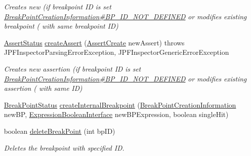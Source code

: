 \begin{DoxyCompactItemize}
\begin{DoxyCompactList}\small\item\em Creates new (if breakpoint ID is set \hyperlink{interfacegov_1_1nasa_1_1jpf_1_1inspector_1_1interfaces_1_1_break_point_creation_information_a24626231e3744e59f505d0731d4ca9e1}{Break\+Point\+Creation\+Information\#\+B\+P\+\_\+\+I\+D\+\_\+\+N\+O\+T\+\_\+\+D\+E\+F\+I\+N\+ED} or modifies existing breakpoint ( with same breakpoint ID) \end{DoxyCompactList}\item 
\hyperlink{interfacegov_1_1nasa_1_1jpf_1_1inspector_1_1interfaces_1_1_assert_status}{Assert\+Status} \hyperlink{classgov_1_1nasa_1_1jpf_1_1inspector_1_1server_1_1breakpoints_1_1_break_point_handler_a770f440dad54f670230ad73196da657d}{create\+Assert} (\hyperlink{interfacegov_1_1nasa_1_1jpf_1_1inspector_1_1interfaces_1_1_assert_create}{Assert\+Create} new\+Assert)  throws J\+P\+F\+Inspector\+Parsing\+Error\+Exception, J\+P\+F\+Inspector\+Generic\+Error\+Exception 
\begin{DoxyCompactList}\small\item\em Creates new assertion (if breakpoint ID is set \hyperlink{interfacegov_1_1nasa_1_1jpf_1_1inspector_1_1interfaces_1_1_break_point_creation_information_a24626231e3744e59f505d0731d4ca9e1}{Break\+Point\+Creation\+Information\#\+B\+P\+\_\+\+I\+D\+\_\+\+N\+O\+T\+\_\+\+D\+E\+F\+I\+N\+ED} or modifies existing assertion ( with same ID) \end{DoxyCompactList}\item 
\hyperlink{interfacegov_1_1nasa_1_1jpf_1_1inspector_1_1interfaces_1_1_break_point_status}{Break\+Point\+Status} \hyperlink{classgov_1_1nasa_1_1jpf_1_1inspector_1_1server_1_1breakpoints_1_1_break_point_handler_ac60a6198df25bc3076016a711f5f7346}{create\+Internal\+Breakpoint} (\hyperlink{interfacegov_1_1nasa_1_1jpf_1_1inspector_1_1interfaces_1_1_break_point_creation_information}{Break\+Point\+Creation\+Information} new\+BP, \hyperlink{interfacegov_1_1nasa_1_1jpf_1_1inspector_1_1server_1_1expression_1_1_expression_boolean_interface}{Expression\+Boolean\+Interface} new\+B\+P\+Expression, boolean single\+Hit)
\item 
boolean \hyperlink{classgov_1_1nasa_1_1jpf_1_1inspector_1_1server_1_1breakpoints_1_1_break_point_handler_a4c444acaa59fee166890c193874cf491}{delete\+Break\+Point} (int bp\+ID)
\begin{DoxyCompactList}\small\item\em Deletes the breakpoint with specified ID. \end{DoxyCompactList}\item 

\end{DoxyCompactItemize}
